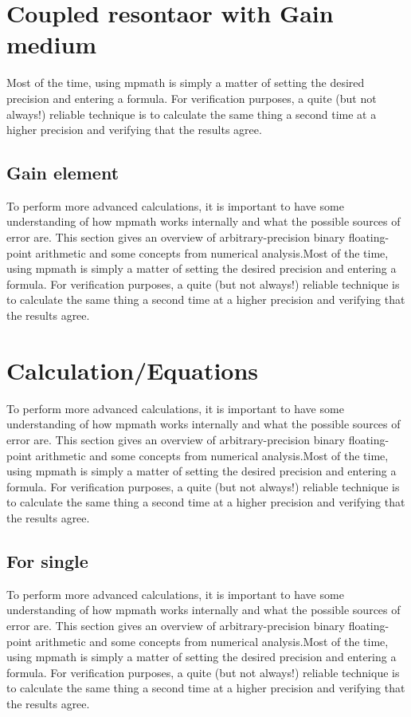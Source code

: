 \section{Coupled resontaor with Gain medium}
Most of the time, using mpmath is simply a matter of setting the desired precision and entering a formula. For verification purposes, a quite (but not always!) reliable technique is to calculate the same thing a second time at a higher precision and verifying that the results agree.
\subsection{Gain element}
To perform more advanced calculations, it is important to have some understanding of how mpmath works internally and what the possible sources of error are. This section gives an overview of arbitrary-precision binary floating-point arithmetic and some concepts from numerical analysis.Most of the time, using mpmath is simply a matter of setting the desired precision and entering a formula. For verification purposes, a quite (but not always!) reliable technique is to calculate the same thing a second time at a higher precision and verifying that the results agree.

\section{Calculation/Equations}
To perform more advanced calculations, it is important to have some understanding of how mpmath works internally and what the possible sources of error are. This section gives an overview of arbitrary-precision binary floating-point arithmetic and some concepts from numerical analysis.Most of the time, using mpmath is simply a matter of setting the desired precision and entering a formula. For verification purposes, a quite (but not always!) reliable technique is to calculate the same thing a second time at a higher precision and verifying that the results agree.

\subsection{For single}
To perform more advanced calculations, it is important to have some understanding of how mpmath works internally and what the possible sources of error are. This section gives an overview of arbitrary-precision binary floating-point arithmetic and some concepts from numerical analysis.Most of the time, using mpmath is simply a matter of setting the desired precision and entering a formula. For verification purposes, a quite (but not always!) reliable technique is to calculate the same thing a second time at a higher precision and verifying that the results agree.
